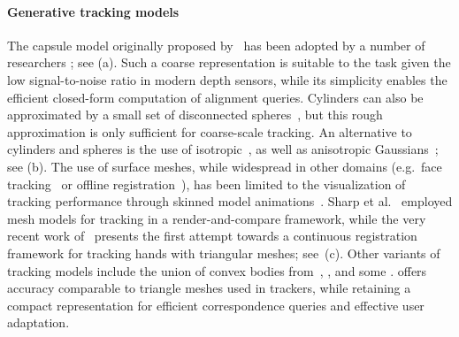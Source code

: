 \paragraph{Generative tracking models}
The capsule model originally proposed by~\cite{rehg1994tracking} has been adopted by a number of researchers \cite{oiko2011hand,schroder2014real,fleishman2015icpik,tagliasacchi2015robust}; see (a). Such a coarse representation is suitable to the task given the low signal-to-noise ratio in modern depth sensors, while its simplicity enables the efficient closed-form computation of alignment queries. Cylinders can also be approximated by a small set of disconnected spheres~\cite{qian2014realtime}, but this rough approximation is only sufficient for coarse-scale tracking. An alternative to cylinders and spheres is the use of isotropic~\cite{sridhar2013multicam,sridhar2015fast}, as well as anisotropic Gaussians~\cite{sridhar2014anisotropic}; see (b).
% 
%
The use of surface meshes, while widespread in other domains (e.g.\ face tracking~\cite{bouaziz2013online} or offline registration~\cite{loper_eccv14}), has been limited to the visualization of tracking performance through skinned model animations~\cite{tompson2014real,schroder2014real}. Sharp et al.~ employed mesh models for tracking in a render-and-compare framework, while the very recent work of~\cite{taylor2016concerto} presents the first attempt towards a continuous registration framework for tracking hands with triangular meshes; see~(c).
%
Other variants of tracking models include the union of convex bodies from~\cite{melax2013dynamics}, , and some .
% 
 offers accuracy comparable to triangle meshes used in  trackers, while retaining a compact representation for efficient correspondence queries and effective user adaptation.

